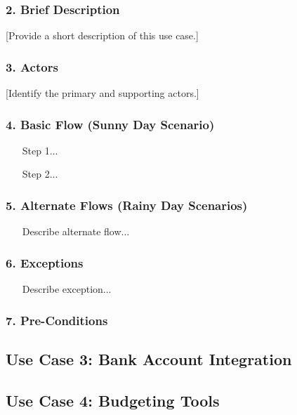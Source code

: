 \subsubsection*{2. Brief Description}
[Provide a short description of this use case.]

\subsubsection*{3. Actors}
[Identify the primary and supporting actors.]

\subsubsection*{4. Basic Flow (Sunny Day Scenario)}
\begin{enumerate}
    \item [Step 1...]
    \item [Step 2...]
\end{enumerate}

\subsubsection*{5. Alternate Flows (Rainy Day Scenarios)}
\begin{enumerate}[label=5.\arabic*]
    \item [Describe alternate flow...]
\end{enumerate}

\subsubsection*{6. Exceptions}
\begin{enumerate}[label=6.\arabic*]
    \item [Describe exception...]
\end{enumerate}

\subsubsection*{7. Pre-Conditions}

\subsection{Use Case 3: Bank Account Integration}

\subsection{Use Case 4: Budgeting Tools}

